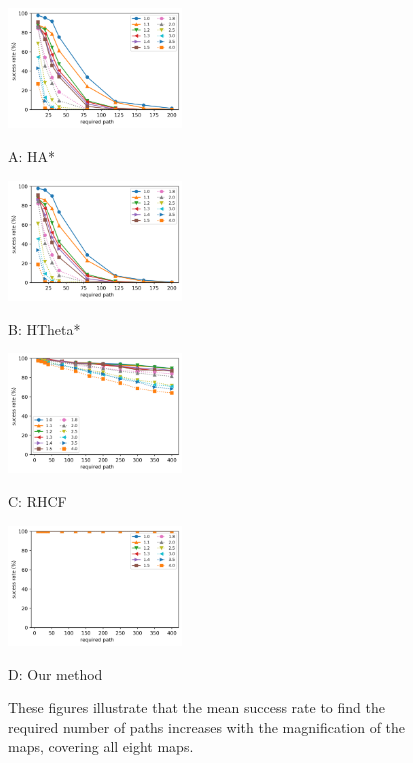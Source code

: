 \documentclass[lettersize,journal]{IEEEtran}
\begin{document}
\begin{figure}[t] \scriptsize
\begin{minipage}{.245\linewidth}
  \centerline{\includegraphics[width=4.6cm]{HsAs_scale_succ_method_path_count.png}}
  \centerline{A: HA*}
\end{minipage}
\hfill
\begin{minipage}{.245\linewidth}
  \centerline{\includegraphics[width=4.6cm]{HsTs_scale_succ_method_path_count.png}}
  \centerline{B: HTheta*}
\end{minipage}
\hfill
\begin{minipage}{.245\linewidth}
  \centerline{\includegraphics[width=4.6cm]{RHCF_scale_succ_method_path_count.png}}
  \centerline{C: RHCF}
\end{minipage}
\hfill
\begin{minipage}{.245\linewidth}
  \centerline{\includegraphics[width=4.6cm]{RJ_scale_succ_method_path_count.png}}
  \centerline{D: Our method}
\end{minipage}
\vfill

\caption{These figures illustrate that the mean success rate to find the required number of paths increases with the magnification of the maps, covering all eight maps.}
\label{scale_succ_method_path_count}
\end{figure}
\end{document}
